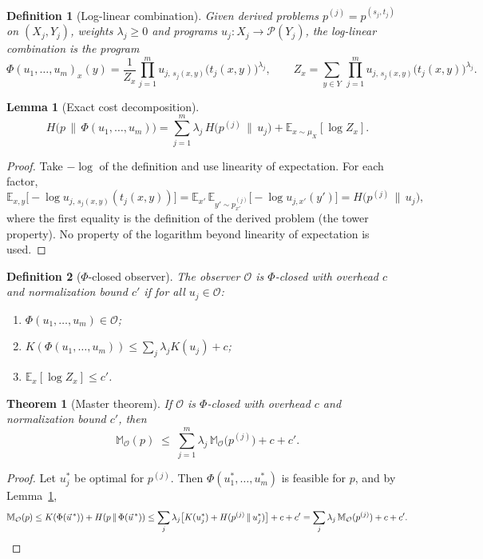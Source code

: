 \documentclass[11pt]{article}
\newtheorem{definition}{Definition}
\newtheorem{theorem}{Theorem}
\newtheorem{lemma}{Lemma}
\begin{document}
\begin{definition}[Log-linear combination]
Given derived problems $p^{(j)} = p^{(s_j, t_j)}$ on $(X_j, Y_j)$, weights $\lambda_j \geq 0$ and programs $u_j: X_j \to \mathcal P(Y_j)$, the \emph{log-linear combination} is the program
\[ \Phi(u_1, \ldots, u_m)_x(y) = \frac{1}{Z_x} \prod_{j=1}^m u_{j,\, s_j(x,y)}\big(t_j(x,y)\big)^{\lambda_j}, \qquad Z_x = \sum_{y \in Y}\, \prod_{j=1}^m u_{j,\, s_j(x,y)}\big(t_j(x,y)\big)^{\lambda_j}. \]
\end{definition}

\begin{lemma}[Exact cost decomposition]\label{lem:loglinear}
\[ H\big(p \,\|\, \Phi(u_1,\ldots,u_m)\big) = \sum_{j=1}^m \lambda_j\, H\big(p^{(j)} \,\|\, u_j\big) + \mathbb E_{x \sim \mu_X}[\log Z_x]. \]
\end{lemma}

\begin{proof}
Take $-\log$ of the definition and use linearity of expectation. For each factor,
\[ \mathbb E_{x, y}\big[-\log u_{j,\, s_j(x,y)}(t_j(x,y))\big] = \mathbb E_{x'}\, \mathbb E_{y' \sim p^{(j)}_{x'}}\big[-\log u_{j,x'}(y')\big] = H\big(p^{(j)} \,\|\, u_j\big), \]
where the first equality is the definition of the derived problem (the tower property). No property of the logarithm beyond linearity of expectation is used.
\end{proof}

\begin{definition}[$\Phi$-closed observer]
The observer $\mathcal O$ is \emph{$\Phi$-closed with overhead $c$ and normalization bound $c'$} if for all $u_j \in \mathcal O$:
\begin{enumerate}
    \item $\Phi(u_1,\ldots,u_m) \in \mathcal O$;
    \item $K(\Phi(u_1,\ldots,u_m)) \leq \sum_j \lambda_j K(u_j) + c$;
    \item $\mathbb E_{x}[\log Z_x] \leq c'$.
\end{enumerate}
\end{definition}

\begin{theorem}[Master theorem]\label{thm:master}
If $\mathcal O$ is $\Phi$-closed with overhead $c$ and normalization bound $c'$, then
\[ \mathbb M_\mathcal{O}(p) \;\leq\; \sum_{j=1}^m \lambda_j\, \mathbb M_\mathcal{O}\big(p^{(j)}\big) + c + c'. \]
\end{theorem}

\begin{proof}
Let $u_j^*$ be optimal for $p^{(j)}$. Then $\Phi(u_1^*, \ldots, u_m^*)$ is feasible for $p$, and by Lemma~\ref{lem:loglinear},
\[ \mathbb M_\mathcal{O}(p) \leq K(\Phi(\vec u^{\,*})) + H(p \,\|\, \Phi(\vec u^{\,*})) \leq \sum_j \lambda_j \big[K(u_j^*) + H(p^{(j)} \,\|\, u_j^*)\big] + c + c' = \sum_j \lambda_j\, \mathbb M_\mathcal{O}(p^{(j)}) + c + c'. \qedhere \]
\end{proof}
\end{document}
